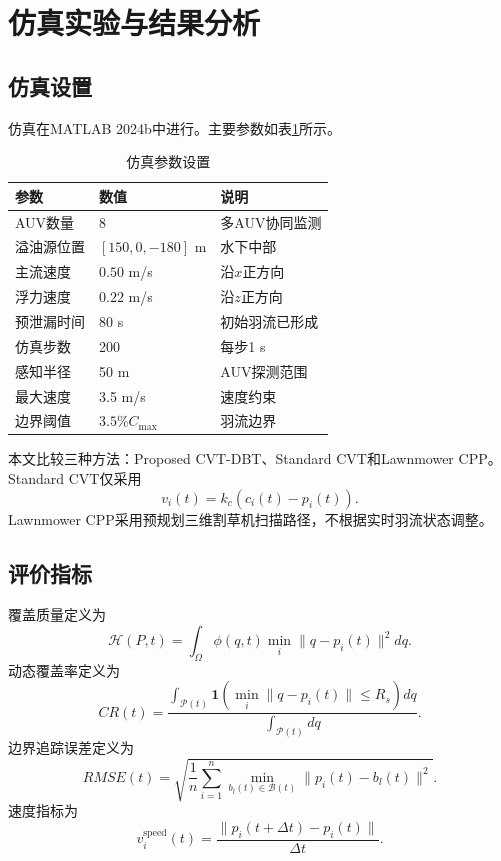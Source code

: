 \documentclass[conference]{IEEEtran}
\begin{document}
\section{仿真实验与结果分析}
\subsection{仿真设置}
仿真在MATLAB 2024b中进行。主要参数如表\ref{tab:params}所示。

\begin{table}[htbp]
\caption{仿真参数设置}
\label{tab:params}
\centering
\begin{tabular}{lll}
\toprule
参数 & 数值 & 说明\\
\midrule
AUV数量 & 8 & 多AUV协同监测\\
溢油源位置 & $[150,0,-180]$ m & 水下中部\\
主流速度 & $0.50$ m/s & 沿$x$正方向\\
浮力速度 & $0.22$ m/s & 沿$z$正方向\\
预泄漏时间 & $80$ s & 初始羽流已形成\\
仿真步数 & 200 & 每步1 s\\
感知半径 & 50 m & AUV探测范围\\
最大速度 & 3.5 m/s & 速度约束\\
边界阈值 & $3.5\%C_{\max}$ & 羽流边界\\
\bottomrule
\end{tabular}
\end{table}

本文比较三种方法：Proposed CVT-DBT、Standard CVT和Lawnmower CPP。Standard CVT仅采用
\begin{equation}
v_i(t)=k_c(c_i(t)-p_i(t)).
\end{equation}
Lawnmower CPP采用预规划三维割草机扫描路径，不根据实时羽流状态调整。

\subsection{评价指标}
覆盖质量定义为
\begin{equation}
\mathcal{H}(P,t)=
\int_{\Omega}\phi(q,t)\min_i\|q-p_i(t)\|^2dq.
\end{equation}
动态覆盖率定义为
\begin{equation}
CR(t)=
\frac{
\int_{\mathcal{P}(t)}
\mathbf{1}\left(\min_i\|q-p_i(t)\|\leq R_s\right)dq
}{
\int_{\mathcal{P}(t)}dq
}.
\end{equation}
边界追踪误差定义为
\begin{equation}
RMSE(t)=
\sqrt{
\frac{1}{n}
\sum_{i=1}^{n}
\min_{b_l(t)\in\mathcal{B}(t)}
\|p_i(t)-b_l(t)\|^2
}.
\end{equation}
速度指标为
\begin{equation}
v_i^{\mathrm{speed}}(t)=
\frac{\|p_i(t+\Delta t)-p_i(t)\|}{\Delta t}.
\end{equation}
\end{document}
